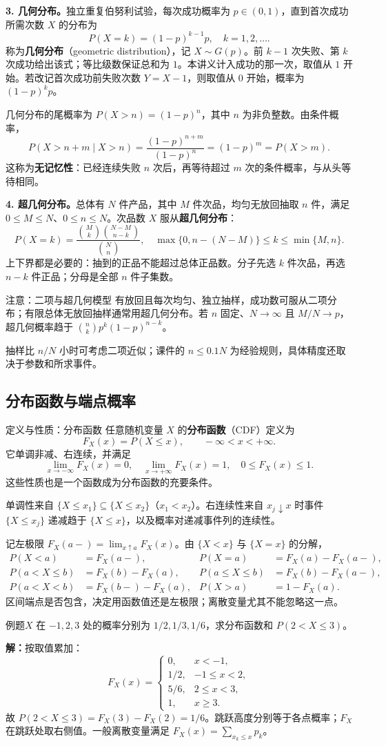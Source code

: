 \documentclass[UTF8,fontset=none,zihao=-4,a4paper]{ctexart}
\newcommand{\term}[1]{\textbf{#1}}
\newcommand{\example}[1]{\begin{infobox}{例题}#1\end{infobox}}
\newcommand{\solution}{\par\noindent\textbf{解：}}
\newcommand{\com}[2]{\binom{#1}{#2}}
\begin{document}
\textbf{3. 几何分布。}独立重复伯努利试验，每次成功概率为 $p\in(0,1)$，直到首次成功所需次数 $X$ 的分布为
\[
P(X=k)=(1-p)^{k-1}p,\quad k=1,2,\ldots.
\]
称为\term{几何分布}（geometric distribution），记 $X\sim G(p)$。前 $k-1$ 次失败、第 $k$ 次成功给出该式；等比级数保证总和为 $1$。本讲义计入成功的那一次，取值从 $1$ 开始。若改记首次成功前失败次数 $Y=X-1$，则取值从 $0$ 开始，概率为 $(1-p)^kp$。

几何分布的尾概率为 $P(X>n)=(1-p)^n$，其中 $n$ 为非负整数。由条件概率，
\[
P(X>n+m\mid X>n)=\frac{(1-p)^{n+m}}{(1-p)^n}
=(1-p)^m=P(X>m).
\]
这称为\term{无记忆性}：已经连续失败 $n$ 次后，再等待超过 $m$ 次的条件概率，与从头等待相同。

\textbf{4. 超几何分布。}总体有 $N$ 件产品，其中 $M$ 件次品，均匀无放回抽取 $n$ 件，满足 $0\le M\le N$、$0\le n\le N$。次品数 $X$ 服从\term{超几何分布}：
\[
P(X=k)=\frac{\com Mk\com{N-M}{n-k}}{\com Nn},
\quad \max\{0,n-(N-M)\}\le k\le\min\{M,n\}.
\]
上下界都是必要的：抽到的正品不能超过总体正品数。分子先选 $k$ 件次品，再选 $n-k$ 件正品；分母是全部 $n$ 件子集数。
\begin{infobox}{注意：二项与超几何模型}
有放回且每次均匀、独立抽样，成功数可服从二项分布；有限总体无放回抽样通常用超几何分布。若 $n$ 固定、$N\to\infty$ 且 $M/N\to p$，超几何概率趋于 $\com nk p^k(1-p)^{n-k}$。

抽样比 $n/N$ 小时可考虑二项近似；课件的 $n\le0.1N$ 为经验规则，具体精度还取决于参数和所求事件。
\end{infobox}
\subsection{分布函数与端点概率}
\begin{infobox}{定义与性质：分布函数}
任意随机变量 $X$ 的\term{分布函数}（CDF）定义为
\[
F_X(x)=P(X\le x),\qquad -\infty<x<+\infty.
\]
它单调非减、右连续，并满足
\[
\lim_{x\to-\infty}F_X(x)=0,\quad
\lim_{x\to+\infty}F_X(x)=1,\quad 0\le F_X(x)\le1.
\]
这些性质也是一个函数成为分布函数的充要条件。
\end{infobox}
单调性来自 $\{X\le x_1\}\subseteq\{X\le x_2\}$（$x_1<x_2$）。右连续性来自 $x_j\downarrow x$ 时事件 $\{X\le x_j\}$ 递减趋于 $\{X\le x\}$，以及概率对递减事件列的连续性。

记左极限 $F_X(a-)=\lim_{x\uparrow a}F_X(x)$。由 $\{X<x\}$ 与 $\{X=x\}$ 的分解，
\begin{align*}
P(X<a)&=F_X(a-),&P(X=a)&=F_X(a)-F_X(a-),\\
P(a<X\le b)&=F_X(b)-F_X(a),&P(a\le X\le b)&=F_X(b)-F_X(a-),\\
P(a<X<b)&=F_X(b-)-F_X(a),&P(X>a)&=1-F_X(a).
\end{align*}
区间端点是否包含，决定用函数值还是左极限；离散变量尤其不能忽略这一点。
\example{$X$ 在 $-1,2,3$ 处的概率分别为 $1/2,1/3,1/6$，求分布函数和 $P(2<X\le3)$。}
\solution 按取值累加：
\[
F_X(x)=\begin{cases}
0,&x<-1,\\1/2,&-1\le x<2,\\5/6,&2\le x<3,\\1,&x\ge3.
\end{cases}
\]
故 $P(2<X\le3)=F_X(3)-F_X(2)=1/6$。跳跃高度分别等于各点概率；$F_X$ 在跳跃处取右侧值。一般离散变量满足 $F_X(x)=\sum_{x_k\le x}p_k$。
\end{document}
